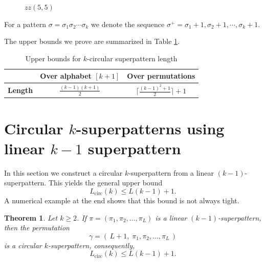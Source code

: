 \documentclass[a4paper,12pt]{article}
\newtheorem{theorem}{Theorem}[section]
\theoremstyle{definition}
\numberwithin{equation}{section}
\begin{document}
\begin{figure}[H]
    \centering
{}
    \caption{$zz(5,5)$}
    \label{zz(5,5)}
\end{figure}

For a pattern $\sigma = \sigma_1 \sigma_2 \cdots \sigma_k$ we denote the sequence $\sigma^+  = \sigma_1+1 ,\sigma_2+1, \cdots ,\sigma_k+1$. 


The upper bounds we prove are summarized in Table \ref{results}.

\begin{table}[h]
\centering
\caption{Upper bounds for $k$-circular superpattern length}\label{results}
\renewcommand{\arraystretch}{1.2}
\begin{tabular}{@{}lcc@{}}
& \textbf{Over alphabet $[k+1]$} 
& \textbf{Over permutations} \\ 
\midrule
\textbf{Length} 
& $\displaystyle \frac{(k-1)(k+1)}{2}$ 
& $\displaystyle \Big\lceil \frac{(k-1)^{2}+1}{2} \Big\rceil + 1$ \\
\bottomrule
\end{tabular}
\end{table}

\section{Circular $k$-superpatterns using linear $k-1$ superpattern}

In this section we construct a circular $k$-superpattern from a linear $(k-1)$-superpattern.  
This yields the general upper bound
\[
L_{\mathrm{circ}}(k) \le L(k-1) + 1.
\]
A numerical example at the end shows that this bound is not always tight.

\begin{theorem}\label{thm:circ_length}
Let $k \ge 2$.  
If $\pi = (\pi_1, \pi_2, \dots, \pi_L)$ is a linear $(k-1)$-superpattern, then the permutation  
\[
\gamma = (\,L+1,\; \pi_1, \pi_2, \dots, \pi_L\,)
\]
is a circular $k$-superpattern, consequently,
\[
L_{\mathrm{circ}}(k) \le L(k-1) + 1.
\]
\end{theorem}
\end{document}
